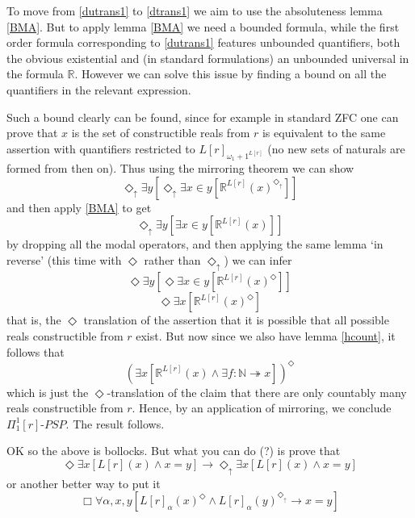 \documentclass{article}
\theoremstyle{definition}
\newcommand{\du}{\Diamond_\uparrow}
\begin{document}
To move from \eqref{dutrans1} to \eqref{dtrans1} we aim to use the absoluteness 
lemma \ref{BMA}. But to apply lemma \ref{BMA} we need a bounded formula, while the 
first order formula corresponding to \eqref{dutrans1} features unbounded quantifiers, 
both the obvious existential and (in standard formulations) an unbounded universal 
in the formula $\mathbb{R}$. However we can solve this issue by finding a bound 
on all the quantifiers in the relevant expression.

Such a bound clearly can be found, since for example 
in standard ZFC one can prove that $x$ is the set of constructible reals from $r$ 
is equivalent to the same assertion with quantifiers restricted to
$L[r]_{\omega_1 + 1^{L[r]}}$ (no new sets of naturals are formed from then on). 
Thus using the mirroring theorem we can show
\begin{equation}
    \du \exists y[ \du \exists x \in y[\mathbb{R}^{L[r]}(x)^{\du} ]]
\end{equation}
and then apply \ref{BMA} to get 
\begin{equation}
    \du \exists y[ \exists x \in y[\mathbb{R}^{L[r]}(x) ]]
\end{equation}
by dropping all the modal operators, and then applying the same lemma `in reverse' 
(this time with $\Diamond$ rather than $\du$) we can infer
\begin{equation}
    \Diamond \exists y[ \Diamond \exists x \in y[\mathbb{R}^{L[r]}(x)^\Diamond ]]
\end{equation}
\begin{equation}
    \Diamond \exists x[\mathbb{R}^{L[r]}(x)^\Diamond]
\end{equation}
that is, the $\Diamond$ translation of the assertion that it is possible that all possible 
reals constructible from $r$ exist. But now since we also have lemma \ref{hcount}, it follows that 
\begin{equation}
    (\exists x[\mathbb{R}^{L[r]}(x) \wedge \exists f : \mathbb{N} \twoheadrightarrow x])^\Diamond
\end{equation}
which is just the $\Diamond$-translation of the claim that there are only countably many 
reals constructible from $r$. Hence, by an application of mirroring, we conclude $\Pi_1^1[r]$-$PSP$.
The result follows.

OK so the above is bollocks. But what you can do (?) is prove that 
\[\Diamond \exists x[ L[r](x) \wedge x = y] \rightarrow \du \exists x [L[r](x) \wedge x = y]\]
or another better way to put it
\[ \Box \forall \alpha, x, y [ L[r]_\alpha (x) ^\Diamond \wedge L[r]_\alpha (y)^{\du} \rightarrow x = y] \]
\end{document}
